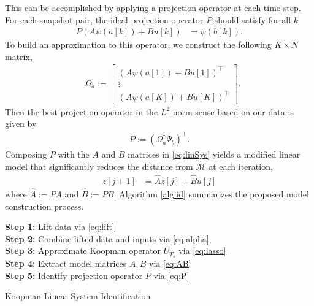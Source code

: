 This can be accomplished by applying a projection operator at each time step.
For each snapshot pair, the ideal projection operator $P$ should satisfy for all $k$
\begin{align}
    P \left( A {\psi}(a[k]) + B u[k] \right) &= \psi(b[k]).
\end{align}
To build an approximation to this operator, we construct the following $K \times N$ matrix,
\begin{align}
    &\Omega_a := \begin{bmatrix} \left( A {\psi}(a[1]) + B u[1] \right)^\top \\ \vdots \\  \left( A {\psi}(a[K]) + B u[K] \right)^\top \end{bmatrix}.
    \label{eq:Omega}
\end{align}
Then the best projection operator in the $L^2$-norm sense based on our data is given by
\begin{align}
    P := \left( \Omega_{a}^\dagger \Psi_b \right)^\top.
    \label{eq:P}
\end{align}
Composing $P$ with the $A$ and $B$ matrices in \eqref{eq:linSys} yields a modified linear model that significantly reduces the distance from $\mathcal{M}$ at each iteration,
\begin{align}
    z[j+1] &= \hat{A} z[j] + \hat{B} u[j]
    \label{eq:linSys_wP}
\end{align}
where $\hat{A} := PA$ and  $\hat{B} := PB$.
Algorithm \ref{alg:id} summarizes the proposed model construction process.


\begin{algorithm}[t]
\SetAlgoLined
{}
\textbf{Step 1:} Lift data via \eqref{eq:lift} \\
\textbf{Step 2:} Combine lifted data and inputs via \eqref{eq:alpha} \\
\textbf{Step 3:} Approximate Koopman operator $\bar{U}_{T_s}$ via \eqref{eq:lasso} \\
\textbf{Step 4:} Extract model matrices $A,B$ via \eqref{eq:AB} \\
\textbf{Step 5:} Identify projection operator $P$ via \eqref{eq:P} \\
 \caption{Koopman Linear System Identification}
 \label{alg:id}
\end{algorithm}